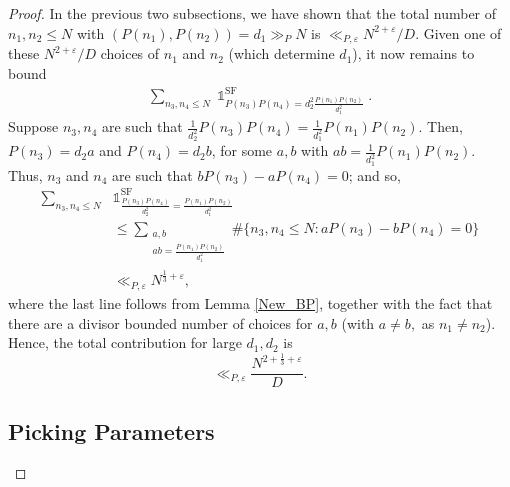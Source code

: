 \documentclass[11pts]{amsart}
\numberwithin{equation}{section}
\DeclareMathOperator{\one}{\mathds{1}}
\begin{document}
\begin{proof}
In the previous two subsections, we have shown that the total number of $n_1,n_2\leq N$ with $(P(n_1),P(n_2))=d_1\gg_P N$ is $\ll_{P,\varepsilon}N^{2+\varepsilon}/D$. Given one of these $N^{2+\varepsilon}/D$ choices of $n_1$ and $n_2$ (which determine $d_1$), it now remains to bound
    \begin{align*}
        \sum_{n_3,n_4\leq N}\one_{P(n_3)P(n_4)=d_2^2\frac{P(n_1)P(n_2)}{d_1^2}}^{\text{SF}}.
    \end{align*}
Suppose $n_3,n_4$ are such that $\frac{1}{d_2^2}P(n_3)P(n_4)=\frac{1}{d_1^2}{P(n_1)P(n_2)}$. Then, $P(n_3)=d_2a$ and $P(n_4)=d_2b$, for some $a,b$ with $ab=\frac{1}{d_1^2}{P(n_1)P(n_2)}$. Thus, $n_3$ and $n_4$ are such that $bP(n_3)-aP(n_4)=0$; and so,
\begin{align*}
       \sum_{n_3,n_4\leq N}&\one_{\frac{P(n_3)P(n_4)}{d_2^2}=\frac{P(n_1)P(n_2)}{d_1^2}}^{\text{SF}}\\
       &\leq
       \sum_{\substack{{a,b}\\{ab=\frac{P(n_1)P(n_2)}{d_1^2}}}}
       \#\{n_3,n_4\leq N: aP(n_3)-bP(n_4)=0\}\\
       &\ll_{P,\varepsilon} N^{\frac{1}{3}+\varepsilon},
\end{align*}
where the last line follows from Lemma \ref{New_BP}, together with the fact that there are a divisor bounded number of choices for $a,b$ (with $a\neq b,$ as $n_1\neq n_2$). Hence, the total contribution for large $d_1,d_2$ is
\[
\ll_{P,\varepsilon} \frac{N^{2+\frac{1}{3}+\varepsilon}}{D}.
\]




\subsection{Picking Parameters}


\end{proof}
\end{document}
